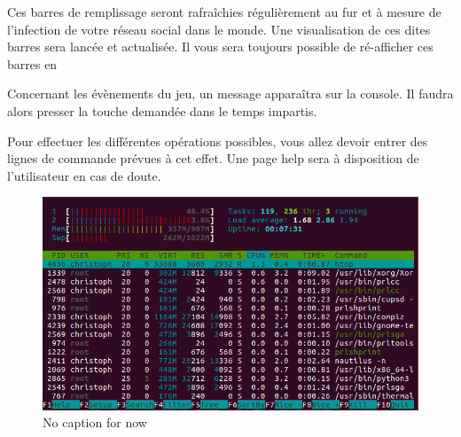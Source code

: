 Ces barres de remplissage seront rafraîchies régulièrement au fur et à mesure de l'infection de votre réseau social dans le monde. Une visualisation de ces dites barres sera lancée et actualisée. Il vous sera toujours possible de ré-afficher ces barres en 

Concernant les évènements du jeu, un message apparaîtra sur la console. Il faudra alors presser la touche demandée dans le temps impartis.

Pour effectuer les différentes opérations possibles, vous allez devoir entrer des lignes de commande prévues à cet effet. Une page help sera à disposition de l'utilisateur en cas de doute. 

\begin{figure}
\begin{center}
\includegraphics{images/htop.png}
\end{center}
\caption{No caption for now }
\label{example}
\end{figure}


